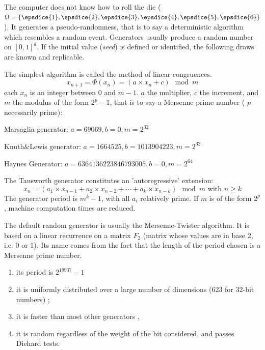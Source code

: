 \begin{f}
The computer does not know how to roll the die (\(\Omega=\{ \epsdice{1}, \epsdice{2}, \epsdice{3}, \epsdice{4}, \epsdice{5}, \epsdice{6} \}\)).
It generates a pseudo-randomness, that is to say a deterministic algorithm which resembles a random event.
Generators usually produce a random number on \([0,1]^d\).
If the initial value (\emph{seed}) is defined or identified, the following draws are known and replicable.


The simplest algorithm is called the method of linear congruences.
\[
x_{n+1}=\Phi(x_n)= (a\times x_n+c) \mod m
\] \small
each \(x_n\) is an integer between 0 and \(m-1\).
\(a\) the multiplier, \(c\) the increment, and \(m\) the modulus of the form \(2^p-1\), that is to say a Mersenne prime number ( \( p \) necessarily prime):

Marsaglia generator: \(a=69069, b=0, m=2^{32}\)

Knuth\&Lewis generator: \(a=1664525, b=1013904223, m=2^{32}\)

Haynes Generator: \(a=6364136223846793005, b=0, m=2^{64}\)

The Tausworth generator constitutes an 'autoregressive' extension:
\[
x_{n}=(a_{1}\times x_{n-1}+a_{2}\times x_{n-2}+\cdots +a_{k}\times x_{n-k}) \mod m \text{ with } n\geq k
\]
The generator period is \(m^k-1\), with all \(a_i\) relatively prime. If \(m\) is of the form \(2^p\) , machine computation times are reduced.


The default random generator is usually the Mersenne-Twister algorithm. It is based on a linear recurrence on a matrix \(F_{2}\) (matrix whose values are in base 2, i.e. 0 or 1). 
Its name comes from the fact that the length of the period chosen is a Mersenne prime number.
\begin{enumerate}
	\item     its period is \(2^{19937}-1 \)
	\item     it is uniformly distributed over a large number of dimensions (623 for 32-bit numbers) ;
	\item     it is faster than most other generators ,
	\item     it is random regardless of the weight of the bit considered, and passes Diehard tests.
\end{enumerate}
\end{f}
%

